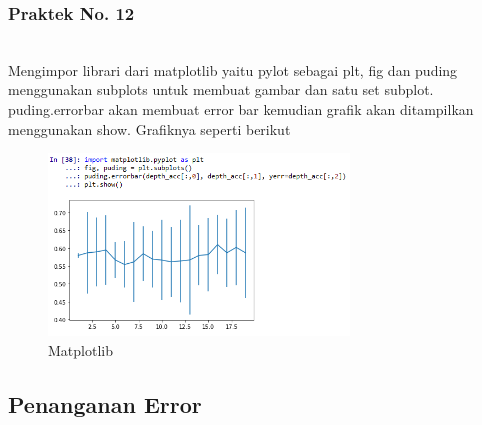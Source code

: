 \subsubsection{Praktek No. 12}
\hfill\\

Mengimpor librari dari matplotlib yaitu pylot sebagai plt, fig dan puding menggunakan subplots untuk membuat gambar dan satu set subplot. puding.errorbar akan membuat error bar kemudian graﬁk akan ditampilkan menggunakan show. Graﬁknya seperti berikut

\begin{figure}[H]
    \includegraphics[width=8cm]{figures/1174083/figures2/p12.png}
    \centering
    \caption{Matplotlib}
\end{figure}

\subsection{Penanganan Error}
